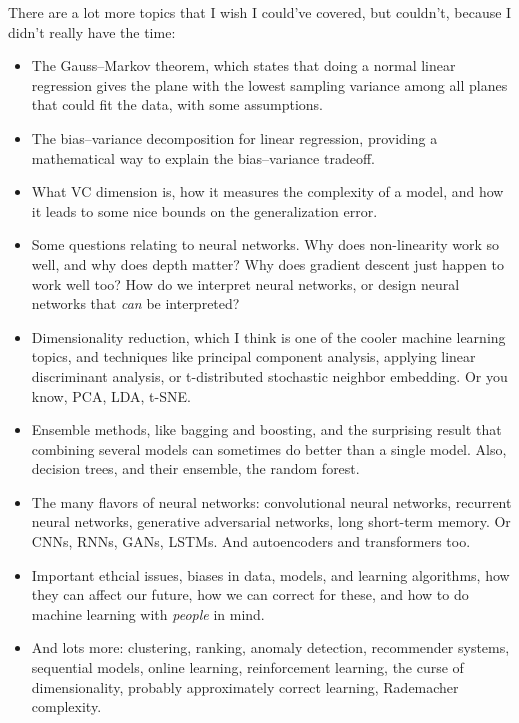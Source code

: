 \documentclass[11pt,paper=letter]{scrartcl}
\begin{document}
There are a lot more topics that I wish I could've covered, but couldn't, because I didn't really have the time:

\begin{itemize}
  \item The Gauss--Markov theorem, which states that doing a normal linear regression gives the plane with the lowest sampling variance among all planes that could fit the data, with some assumptions.

  \item The bias--variance decomposition for linear regression, providing a mathematical way to explain the bias--variance tradeoff.

  \item What VC dimension is, how it measures the complexity of a model, and how it leads to some nice bounds on the generalization error.

  \item Some questions relating to neural networks. Why does non-linearity work so well, and why does depth matter? Why does gradient descent just happen to work well too? How do we interpret neural networks, or design neural networks that \textit{can} be interpreted?

  \item Dimensionality reduction, which I think is one of the cooler machine learning topics, and techniques like principal component analysis, applying linear discriminant analysis, or t-distributed stochastic neighbor embedding. Or you know, PCA, LDA, t-SNE.

  \item Ensemble methods, like bagging and boosting, and the surprising result that combining several models can sometimes do better than a single model. Also, decision trees, and their ensemble, the random forest.

  \item The many flavors of neural networks: convolutional neural networks, recurrent neural networks, generative adversarial networks, long short-term memory. Or CNNs, RNNs, GANs, LSTMs. And autoencoders and transformers too.

  \item Important ethcial issues, biases in data, models, and learning algorithms, how they can affect our future, how we can correct for these, and how to do machine learning with \textit{people} in mind.

  \item And lots more: clustering, ranking, anomaly detection, recommender systems, sequential models, online learning, reinforcement learning, the curse of dimensionality, probably approximately correct learning, Rademacher complexity.
\end{itemize}
\end{document}
